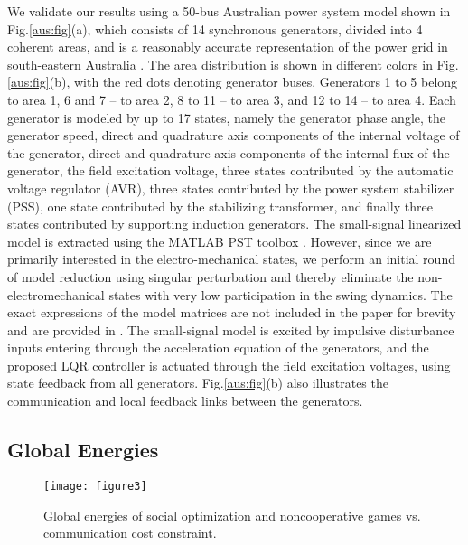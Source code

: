 \documentclass[12pt, draftclsnofoot,onecolumn]{IEEEtran}
\newcommand{\curvewidth}{3.3in}
\newcommand{\curvewidth}{3.5in}
\begin{document}
We validate our results using a 50-bus Australian power system model shown in Fig.\ref{aus:fig}(a), which consists of 14 synchronous generators, divided into 4 coherent areas, and is a reasonably accurate representation of the power grid in south-eastern Australia \cite{Gibbard:2010aa}. The area distribution is shown in different colors in Fig.\ref{aus:fig}(b), with the red dots denoting generator buses. Generators 1 to 5 belong to area 1, 6 and 7 -- to area 2, 8 to 11 -- to area 3, and 12 to 14 -- to area 4. Each generator is modeled by up to 17 states, namely the generator phase angle, the generator speed, direct and quadrature axis components of the internal voltage of the generator, direct and quadrature axis components of the internal flux of the generator, the field excitation voltage, three states contributed by the automatic voltage regulator (AVR), three states contributed by the power system stabilizer (PSS), one state contributed by the stabilizing transformer, and finally three states contributed by supporting induction generators. The small-signal linearized model is extracted using the MATLAB PST toolbox \cite{Chow:1992aa}. However, since we are primarily interested in the electro-mechanical states, we perform an initial round of model reduction using singular perturbation and thereby eliminate the non-electromechanical states with very low participation in the swing dynamics. The exact expressions of the model matrices are not included in the paper for brevity and are provided in \cite{Lian:aa}. The small-signal model is excited by impulsive disturbance inputs entering through the acceleration equation of the generators, and the proposed LQR controller is actuated through the field excitation voltages, using state feedback from all generators. Fig.\ref{aus:fig}(b) also illustrates the communication and local feedback links between the generators. 



\subsection{Global Energies}
\label{alg_pfm:sec}


\begin{figure}[!t]
\centering 
\texttt{[image: figure3]}
\caption{Global energies of social optimization and noncooperative games vs. communication cost constraint.}
\label{J:fig}
\end{figure}
\end{document}
